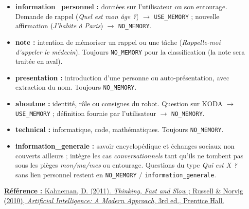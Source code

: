 \documentclass[a4paper,12pt]{report}
\begin{document}
	\begin{itemize}
		
		\item \textbf{information\_personnel :} données sur l'utilisateur ou son
		entourage. Demande de rappel (\textit{Quel est mon âge ?}) $\rightarrow$
		\texttt{USE\_MEMORY} ; nouvelle affirmation (\textit{J'habite à Paris})
		$\rightarrow$ \texttt{NO\_MEMORY}.
		
		\vspace{0.3em}
		
		\item \textbf{note :} intention de mémoriser un rappel ou une tâche
		(\textit{Rappelle-moi d'appeler le médecin}). Toujours \texttt{NO\_MEMORY} pour
		la classification (la note sera traitée en aval).
		
		\vspace{0.3em}
		
		\item \textbf{presentation :} introduction d'une personne ou auto-présentation,
		avec extraction du nom. Toujours \texttt{NO\_MEMORY}.
		
		\vspace{0.3em}
		
		\item \textbf{aboutme :} identité, rôle ou consignes du robot. Question sur KODA
		$\rightarrow$ \texttt{USE\_MEMORY} ; définition fournie par l'utilisateur
		$\rightarrow$ \texttt{NO\_MEMORY}.
		
		\vspace{0.3em}
		
		\item \textbf{technical :} informatique, code, mathématiques. Toujours
		\texttt{NO\_MEMORY}.
		
		\vspace{0.3em}
		
		\item \textbf{information\_generale :} savoir encyclopédique et échanges sociaux
		non couverts ailleurs ; intègre les cas \textit{conversationnels} tant qu'ils
		ne tombent pas sous les pièges \textit{mon/ma/mes} ou entourage. Questions du
		type \textit{Qui est X ?} sans lien personnel restent en
		\texttt{NO\_MEMORY} / \texttt{information\_generale}.
		
	\end{itemize}
	
	\noindent\underline{\textbf{Référence :} Kahneman, D. (2011). \textit{Thinking, Fast
			and Slow} ; Russell \& Norvig (2010), \textit{Artificial Intelligence: A Modern
			Approach}, 3rd ed., Prentice Hall.}
	
\end{document}
